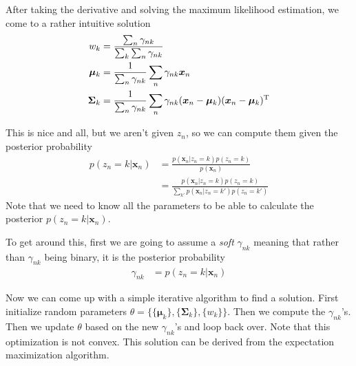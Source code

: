 \documentclass[11pt]{article}
\newcommand{\vct}[1]{\boldsymbol{#1}} %
\newcommand{\mat}[1]{\boldsymbol{#1}} %
\newcommand{\T}{^{\textrm T}} %
\begin{document}
After taking the derivative and solving the maximum likelihood estimation, we come to a rather intuitive solution
\begin{align*}
w_k &= \frac{\sum_n\gamma_{nk}}{\sum_k \sum_n \gamma_{nk}}\\
\vct{\mu}_k &= \frac{1}{\sum_n \gamma_{nk}} \sum_n \gamma_{nk}\vct{x}_n\\
\mat{\Sigma}_k &= \frac{1}{\sum_n \gamma_{nk}} \sum_n \gamma_{nk}(\vct{x}_n - \vct{\mu}_k)(\vct{x}_n - \vct{\mu}_k)\T
\end{align*}

This is nice and all, but we aren't given $z_n$, so we can compute them given the posterior probability
\begin{align*}
p(z_n=k|\vct{x}_n) &= \frac{p(\vct{x}_n|z_n=k)p(z_n=k)}{p(\vct{x}_n)}\\
&= \frac{p(\vct{x}_n|z_n=k)p(z_n=k)}{\sum_{k'} p(\vct{x}_n|z_n=k')p(z_n=k')}
\end{align*}
Note that we need to know all the parameters to be able to calculate the posterior $p(z_n=k|\vct{x}_n)$. 

To get around this, first we are going to assume a {\it soft} $\gamma_{nk}$ meaning that rather than $\gamma_{nk}$ being binary, it is the posterior probability
\begin{align*}
\gamma_{nk} &= p(z_n=k|\vct{x}_n)
\end{align*}

Now we can come up with a simple iterative algorithm to find a solution. First initialize random parameters $\theta = \{ \{ \vct{\mu}_k \}, \{ \mat{\Sigma}_k \}, \{ w_k \} \}$. Then we compute the $\gamma_{nk}$'s. Then we update $\theta$ based on the new $\gamma_{nk}$'s and loop back over. Note that this optimization is not convex. This solution can be derived from the expectation maximization algorithm.
\end{document}
